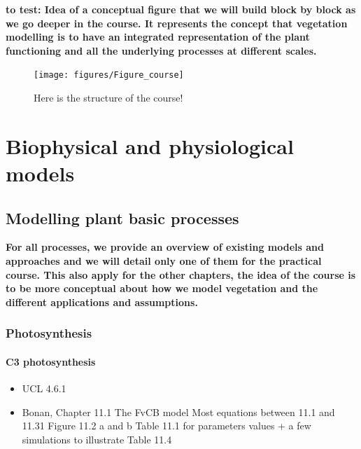 \documentclass[
  oneside]{book}
\providecommand{\tightlist}{%
  \setlength{\itemsep}{0pt}\setlength{\parskip}{0pt}}
\begin{document}
\textbf{to test: Idea of a conceptual figure that we will build block by block as we go deeper in the course. It represents the concept that vegetation modelling is to have an integrated representation of the plant functioning and all the underlying processes at different scales. }

\begin{figure}

{\centering \texttt{[image: figures/Figure\_course]} 

}

\caption{Here is the structure of the course!}\label{fig:nice-fig2}
\end{figure}

\hypertarget{part-biophysical-and-physiological-models}{%
\part{Biophysical and physiological models}\label{part-biophysical-and-physiological-models}}

\hypertarget{modelling-plant-basic-processes}{%
\chapter{Modelling plant basic processes}\label{modelling-plant-basic-processes}}


\textbf{For all processes, we provide an overview of existing models and approaches and we will detail only one of them for the practical course. This also apply for the other chapters, the idea of the course is to be more conceptual about how we model vegetation and the different applications and assumptions.}

\hypertarget{photosynthesis}{%
\section{Photosynthesis}\label{photosynthesis}}

\hypertarget{c3-photosynthesis}{%
\subsection{C3 photosynthesis}\label{c3-photosynthesis}}

\begin{itemize}
\tightlist
\item
  UCL 4.6.1
\item
  Bonan, Chapter 11.1
  The FvCB model
  Most equations between 11.1 and 11.31
  Figure 11.2 a and b
  Table 11.1 for parameters values + a few simulations to illustrate
  Table 11.4
\end{itemize}
\end{document}
